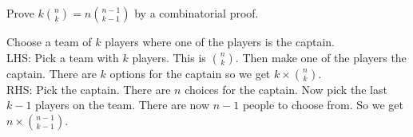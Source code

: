 \question Prove $k\binom{n}{k} = n\binom{n - 1}{k - 1}$ by a combinatorial proof.\\

\begin{solution}[3 cm]
Choose a team of $k$ players where one of the players is the captain. \\
LHS: Pick a team with $k$ players. This is ${n \choose k}$. Then make one of the players the captain. There are $k$ options for the captain so we get $k \times \binom{n}{k}$. \\
RHS: Pick the captain. There are $n$ choices for the captain. Now pick the last $k - 1$ players on the team. There are now $n - 1$ people to choose from. So we get $n \times \binom{n - 1}{k - 1}$.
\end{solution}